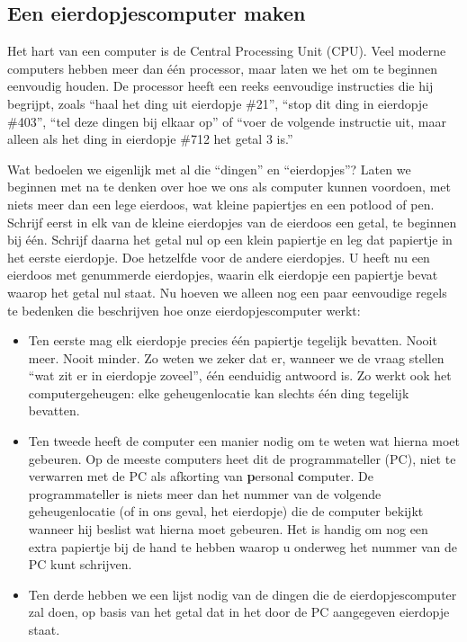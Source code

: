 \subsection{Een eierdopjescomputer maken}

Het hart van een computer is de Central Processing Unit (CPU). Veel moderne computers hebben meer dan één processor, maar laten we het om te beginnen eenvoudig houden. De processor heeft een reeks eenvoudige instructies die hij begrijpt, zoals ``haal het ding uit eierdopje \#21'', ``stop dit ding in eierdopje \#403'', ``tel deze dingen bij elkaar op'' of ``voer de volgende instructie uit, maar alleen als het ding in eierdopje \#712 het getal 3 is.''

Wat bedoelen we eigenlijk met al die ``dingen'' en ``eierdopjes''? Laten we beginnen met na te denken over hoe we ons als computer kunnen voordoen, met niets meer dan een lege eierdoos, wat kleine papiertjes en een potlood of pen. Schrijf eerst in elk van de kleine eierdopjes van de eierdoos een getal, te beginnen bij één. Schrijf daarna het getal nul op een klein papiertje en leg dat papiertje in het eerste eierdopje. Doe hetzelfde voor de andere eierdopjes. U heeft nu een eierdoos met genummerde eierdopjes, waarin elk eierdopje een papiertje bevat waarop het getal nul staat. Nu hoeven we alleen nog een paar eenvoudige regels te bedenken die beschrijven hoe onze eierdopjescomputer werkt:

\begin{itemize}
  \item Ten eerste mag elk eierdopje precies één papiertje tegelijk bevatten. Nooit meer. Nooit minder. Zo weten we zeker dat er, wanneer we de vraag stellen ``wat zit er in eierdopje zoveel'', één eenduidig antwoord is. Zo werkt ook het computergeheugen: elke geheugenlocatie kan slechts één ding tegelijk bevatten.

  \item Ten tweede heeft de computer een manier nodig om te weten wat hierna moet gebeuren. Op de meeste computers heet dit de programmateller (PC), niet te verwarren met de PC als afkorting van {\bf p}ersonal {\bf c}omputer. De programmateller is niets meer dan het nummer van de volgende geheugenlocatie (of in ons geval, het eierdopje) die de computer bekijkt wanneer hij beslist wat hierna moet gebeuren. Het is handig om nog een extra papiertje bij de hand te hebben waarop u onderweg het nummer van de PC kunt schrijven.

  \item Ten derde hebben we een lijst nodig van de dingen die de eierdopjescomputer zal doen, op basis van het getal dat in het door de PC aangegeven eierdopje staat.
\end{itemize}

